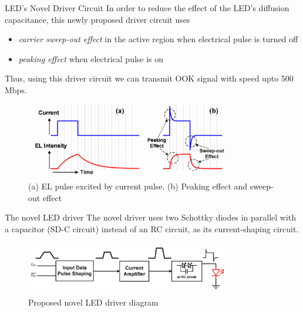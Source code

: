 \documentclass[mathserif]{beamer}
\begin{document}
    
    \begin{frame}{LED's Novel Driver Circuit}
        \pause In order to reduce the effect of the LED's diffusion capacitance, this newly proposed driver circuit uses
        \begin{itemize}
            \pause \item \emph{carrier sweep-out effect} in the active region when electrical pulse is turned off
            \pause \item \emph{peaking effect} when electrical pulse is on
        \end{itemize}
        Thus, using this driver circuit we can transmit OOK signal with speed upto 500 Mbps.  
        
    
 	    \pause
        \begin{figure}
             \centering
             \includegraphics[width=0.8\textwidth]{peakingAndSweepOut.png}
             \caption{(a) EL pulse excited by current pulse. (b) Peaking effect and sweep-out effect}
        \end{figure}
    \end{frame}
    
    
    \begin{frame}{The novel LED driver}
        \pause
        The novel driver uses two Schottky diodes in parallel with a capacitor (SD-C circuit) instead of an RC circuit, as its current-shaping circuit.
        \pause
        \begin{figure}
            \centering
            \includegraphics[width=0.8\textwidth]{novelLEDDriver.png}
            \caption{Proposed novel LED driver diagram}
        \end{figure}
    \end{frame}
\end{document}
